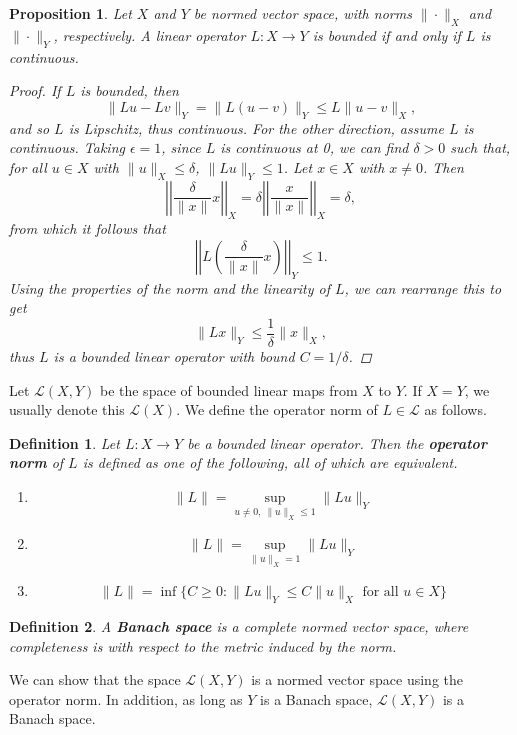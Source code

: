 \documentclass[12pt]{amsart}         %
\newtheorem{definition}{Definition}[section]
\newtheorem{proposition}{Proposition}[section]
\theoremstyle{remark}
\begin{document}
\begin{proposition}
Let $X$ and $Y$ be normed vector space, with norms $\|\cdot\|_X$ and $\|\cdot\|_Y$, respectively. A linear operator $L: X \rightarrow Y$ is bounded if and only if $L$ is continuous.
\begin{proof}
If $L$ is bounded, then 
\[
\|Lu - Lv\|_Y = \|L(u - v)\|_Y \leq L \|u - v\|_X,
\]
and so $L$ is Lipschitz, thus continuous. For the other direction, assume $L$ is continuous. Taking $\epsilon = 1$, since $L$ is continuous at 0, we can find $\delta > 0$ such that, for all $u \in X$ with $\|u\|_X \leq \delta$, $\|Lu\|_Y \leq 1$. Let $x \in X$ with $x \neq 0$. Then 
\[
\left|\left| \frac{\delta}{\|x\|}x \right|\right|_X = 
\delta \left|\left| \frac{x}{\|x\|} \right|\right|_X = \delta,
\]
from which it follows that 
\[
\left|\left| L\left( \frac{\delta}{\|x\|}x \right) \right|\right|_Y \leq 1.
\]
Using the properties of the norm and the linearity of $L$, we can rearrange this to get
\[
\|L x\|_Y \leq \frac{1}{\delta} \|x\|_X,
\]
thus $L$ is a bounded linear operator with bound $C = 1/\delta$.
\end{proof}
\end{proposition}

Let $\mathcal{L}(X, Y)$ be the space of bounded linear maps from $X$ to $Y$. If $X = Y$, we usually denote this $\mathcal{L}(X)$. We define the operator norm of $L \in \mathcal{L}$ as follows.

\begin{definition}
Let $L: X \rightarrow Y$ be a bounded linear operator. Then the \textbf{operator norm} of $L$ is defined as one of the following, all of which are equivalent.
\begin{enumerate}
\item 
\[
\|L\| = \sup_{u \neq 0, \:\|u\|_X \leq 1} \|Lu\|_Y 
\]
\item 
\[
\|L\| = \sup_{\|u\|_X = 1} \|Lu\|_Y 
\]
\item
\[
\|L\| = \inf\{ C \geq 0: \|Lu\|_Y \leq C \|u\|_X \text{ for all } u \in X \}
\]
\end{enumerate}
\end{definition}

\begin{definition}
A \textbf{Banach space} is a complete normed vector space, where completeness is with respect to the metric induced by the norm.
\end{definition}

We can show that the space $\mathcal{L}(X, Y)$ is a normed vector space using the operator norm. In addition, as long as $Y$ is a Banach space, $\mathcal{L}(X, Y)$ is a Banach space.
\end{document}
